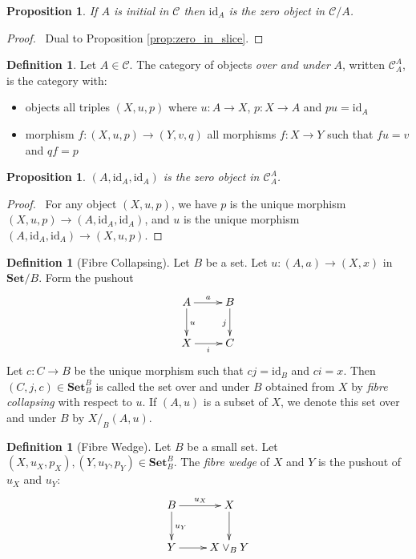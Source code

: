 \documentclass{book}
\let\qed\relax
\newtheorem{prop}[ax]{Proposition}
\theoremstyle{definition}
\newtheorem{df}[ax]{Definition}
\newcommand{\id}[1]{\ensuremath{\mathrm{id}_{#1}}}
\newcommand{\Set}{\ensuremath{\mathbf{Set}}}
\begin{document}
\begin{prop}
If $A$ is initial in $\mathcal{C}$ then $\id{A}$ is the zero object in $\mathcal{C} / A$.
\end{prop}

\begin{proof}
\pf\ Dual to Proposition \ref{prop:zero_in_slice}. \qed
\end{proof}

\begin{df}
Let $A \in \mathcal{C}$.
The category of objects \emph{over and under} $A$, written $\mathcal{C}_A^A$, is the category with:
\begin{itemize}
\item objects all triples $(X,u,p)$ where $u : A \rightarrow X$, $p : X \rightarrow A$ and $pu = \id{A}$
\item morphism $f : (X,u,p) \rightarrow (Y,v,q)$ all morphisms $f : X \rightarrow Y$ such that $fu = v$ and $qf = p$
\end{itemize}
\end{df}

\begin{prop}
$(A, \id{A}, \id{A})$ is the zero object in $\mathcal{C}_A^A$.
\end{prop}

\begin{proof}
\pf\ For any object $(X,u,p)$, we have $p$ is the unique morphism $(X,u,p) \rightarrow (A, \id{A}, \id{A})$, and $u$ is the unique morphism $(A, \id{A}, \id{A}) \rightarrow (X,u,p)$. \qed
\end{proof}

\begin{df}[Fibre Collapsing]
Let $B$ be a set. Let $u : (A,a) \rightarrow (X,x)$ in $\Set / B$. Form the pushout
\[ \xymatrix{
A \ar[r]^a \ar[d]^u & B \ar[d]_j \\
X \ar[r]_i & C
} \]
Let $c : C \rightarrow B$ be the unique morphism such that $cj = \id{B}$ and $ci = x$. Then $(C,j,c) \in \Set_B^B$ is called the set over and under $B$ obtained from $X$ by \emph{fibre collapsing} with respect to $u$. If $(A,u)$ is a subset of $X$, we denote this set over and under $B$ by $X /_B (A,u)$.
\end{df}

\begin{df}[Fibre Wedge]
Let $B$ be a small set. Let $(X,u_X,p_X),(Y, u_Y, p_Y) \in \Set_B^B$. The \emph{fibre wedge} of $X$ and $Y$ is the pushout of $u_X$ and $u_Y$:
\[ \xymatrix{
B \ar[r]^{u_X} \ar[d]^{u_Y} & X \ar[d] \\
Y \ar[r] & X \vee_B Y
} \]
\end{df}
\end{document}
